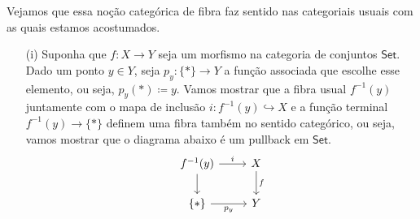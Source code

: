 \begin{exem}
  Vejamos que essa noção categórica de fibra faz sentido nas categoriais usuais com as quais estamos acostumados.

  \begin{enumerate}
  \item[(i)] Suponha que $f: X \to Y$ seja um morfismo na categoria de conjuntos $\mathsf{Set}$.
    Dado um ponto $y \in Y$, seja $p_{y}: \{*\} \to Y$ a função associada que escolhe esse elemento, ou seja, $p_{y}(*) \coloneqq y$.
    Vamos mostrar que a fibra usual $f^{-1}(y)$ juntamente com o mapa de inclusão $i: f^{-1}(y) \hookrightarrow X$ e a função terminal $f^{-1}(y) \to \{*\}$ definem uma fibra também no sentido categórico, ou seja, vamos mostrar que o diagrama abaixo é um pullback em $\mathsf{Set}$.
    \begin{displaymath}
      \begin{tikzcd}
        f^{-1}(y)
        \arrow[r, "i"]
        \arrow[d]
        & X
        \arrow[d, "f"]
        \\ \{*\}
        \arrow[r, "p_{y}" swap]
        & Y
      \end{tikzcd}
    \end{displaymath}


\end{enumerate}
\end{exem}

